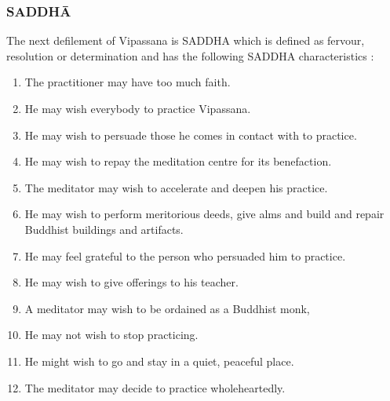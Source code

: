 \documentclass[a5paper,10pt,english]{book}
\begin{document}
\subsubsection{SADDHĀ}
\label{\detokenize{progress:saddha}}
\sphinxAtStartPar
The next defilement of Vipassana is SADDHA which is defined as fervour, resolution or determination and has the following SADDHA characteristics  :\sphinxhyphen{}
\begin{enumerate}
%
\item {} 
\sphinxAtStartPar
The practitioner may have too much faith.

\item {} 
\sphinxAtStartPar
He may wish everybody to practice Vipassana.

\item {} 
\sphinxAtStartPar
He may wish to persuade those he comes in contact with to practice.

\item {} 
\sphinxAtStartPar
He may wish to repay the meditation centre for its benefaction.

\item {} 
\sphinxAtStartPar
The meditator may wish to accelerate and deepen his practice.

\item {} 
\sphinxAtStartPar
He may wish to perform meritorious deeds, give alms and build and repair Buddhist buildings and artifacts.

\item {} 
\sphinxAtStartPar
He may feel grateful to the person who persuaded him to practice.

\item {} 
\sphinxAtStartPar
He may wish to give offerings to his teacher.

\item {} 
\sphinxAtStartPar
A meditator may wish to be ordained as a Buddhist monk,

\item {} 
\sphinxAtStartPar
He may not wish to stop practicing.

\item {} 
\sphinxAtStartPar
He might wish to go and stay in a quiet, peaceful place.

\item {} 
\sphinxAtStartPar
The meditator may decide to practice whole\sphinxhyphen{}heartedly.

\end{enumerate}
\end{document}
